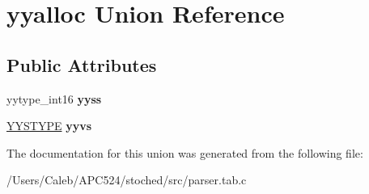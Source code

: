 \hypertarget{unionyyalloc}{}\section{yyalloc Union Reference}
\label{unionyyalloc}
\subsection*{Public Attributes}
\begin{DoxyCompactItemize}
\item 
\mbox{\label{unionyyalloc_aad44e4a724037e32eeb58333c516bb45}} 
yytype\+\_\+int16 {\bfseries yyss}
\item 
\mbox{\label{unionyyalloc_a9494cc8d8cd0eba1b44ca20fe89de5d2}} 
\hyperlink{union_y_y_s_t_y_p_e}{Y\+Y\+S\+T\+Y\+PE} {\bfseries yyvs}
\end{DoxyCompactItemize}


The documentation for this union was generated from the following file\+:\begin{DoxyCompactItemize}
\item 
/\+Users/\+Caleb/\+A\+P\+C524/stoched/src/parser.\+tab.\+c\end{DoxyCompactItemize}
